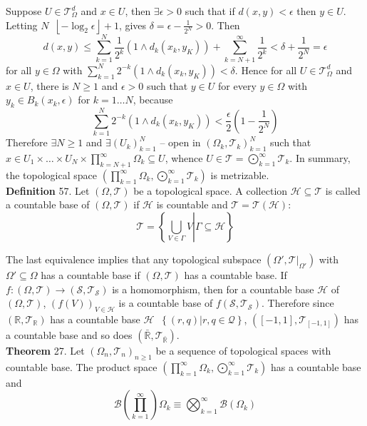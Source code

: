\documentclass[a4paper]{article}
\newcommand{\obj}[1]{\left\{ #1 \right \}}
\newcommand{\clo}[1]{\left [ #1 \right ]}
\newcommand{\brac}[1]{\left ( #1 \right )}
\newcommand{\induc}[1]{\left . #1 \right \vert}
\newcommand{\Rbar}{{\bar{\mathbb{R}}}}
\newcommand{\Real}{\mathbb{R}}
\newcommand{\Tcal}{\mathcal{T}}
\newcommand{\Scal}{\mathcal{S}}
\newcommand{\borel}[1]{\mathcal{B}\brac{#1}}
\newcommand{\defn}{\mathop{\overset{\Delta}{=}}\nolimits}
\begin{document}
Suppose $U\in \Tcal_\Omega^d$ and $x\in U$, then $\exists \epsilon>0$ such that if $d\brac{x,y}<\epsilon$ then $y\in U$. Letting $N\defn\left \lfloor -\log_2 \epsilon\right \rfloor+1$, gives $\delta = \epsilon - \frac{1}{2^N}>0$. Then \[d\brac{ x, y } \leq \sum_{k=1}^N \frac{1}{2^k} \brac{ 1\wedge d_k\brac{ x_k, y_K } } + \sum_{k=N+1}^\infty \frac{1}{2^k} < \delta + \frac{1}{2^N} = \epsilon \] for all $y\in \Omega$ with $\sum_{k=1}^N 2^{-k} \brac{ 1\wedge d_k\brac{ x_k, y_K } } < \delta$. Hence for all $U\in \Tcal_\Omega^d$ and $x\in U$, there is $N\geq 1$ and $\epsilon>0$ such that $y\in U$ for every $y\in \Omega$ with $y_k\in B_k\brac{x_k, \epsilon}$ for $k=1\ldots N$, because \[\sum_{k=1}^N 2^{-k} \brac{ 1\wedge d_k\brac{ x_k, y_K } } < \frac{\epsilon}{2} \brac{ 1-\frac{1}{2^N} }\] Therefore $\exists N\geq 1$ and $\exists \brac{U_k}_{k=1}^N$ -- open in $\brac{\Omega_k, \Tcal_k}_{k=1}^N$ such that $x\in U_1\times\ldots \times U_N \times \prod_{k=N+1}^\infty \Omega_k\subseteq U$, whence $U\in \Tcal = \bigodot_{k=1}^\infty \Tcal_k$. In summary, the topological space $\brac{\prod_{k=1}^\infty \Omega_k, \bigodot_{k=1}^\infty \Tcal_k}$ is metrizable.\\

\noindent \textbf{Definition} 57.
Let $\brac{\Omega, \Tcal}$ be a topological space. A collection $\mathcal{H}\subseteq \Tcal$ is called a countable base of $\brac{\Omega, \Tcal}$ if $\mathcal{H}$ is countable and $\Tcal = \Tcal\brac{\mathcal{H}}$: \[\Tcal = \obj{ \induc{ \bigcup_{ V\in \Gamma } V } \Gamma \subseteq \mathcal{H} }\]

The last equivalence implies that any topological subspace $\brac{\Omega', \induc{\Tcal}_{\Omega'}}$ with $\Omega'\subseteq \Omega$ has a countable base if $\brac{\Omega, \Tcal}$ has a countable base. If $f:\brac{\Omega, \Tcal}\to \brac{\Scal, \Tcal_\Scal}$ is a homomorphism, then for a countable base $\mathcal{H}$ of $\brac{\Omega, \Tcal}$, $\brac{ f\brac{V} }_{V\in \mathcal{H}}$ is a countable base of $f\brac{\Scal, \Tcal_\Scal}$. Therefore since $\brac{\Real, \Tcal_\Real}$ has a countable base $\mathcal{H} \defn \obj{ \induc{ \brac{r,q} } r,q\in \mathcal{Q} }$, $\brac{ \clo{-1, 1 }, \Tcal_{ \clo{ -1, 1 } } }$ has a countable base and so does $\brac{\Rbar, \Tcal_\Rbar}$.\\

\label{thm:topo_count_base} \noindent \textbf{Theorem} 27.
Let $\brac{\Omega_n,\Tcal_n}_{n\geq 1}$ be a sequence of topological spaces with countable base. The product space $\brac{ \prod_{k=1}^\infty \Omega_k, \bigodot_{k=1}^\infty \Tcal_k}$ has a countable base and \[\borel{\prod_{k=1}^\infty} \Omega_k \equiv \bigotimes_{k=1}^\infty \borel{\Omega_k}\]
\end{document}
